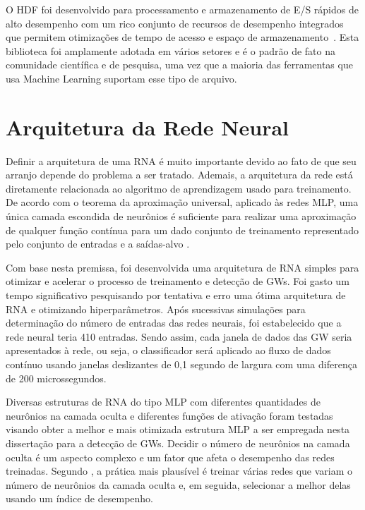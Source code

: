 O HDF foi desenvolvido para processamento e armazenamento de E/S rápidos de alto desempenho com um rico conjunto de recursos de desempenho integrados que permitem otimizações de tempo de acesso e espaço de armazenamento~\cite{hdf}. Esta biblioteca foi amplamente adotada em vários setores e é o padrão de fato na comunidade científica e de pesquisa, uma vez que a maioria das ferramentas que usa Machine Learning suportam esse tipo de arquivo.

\section{Arquitetura da Rede Neural}
\label{sec:arquitetura-rna}

Definir a arquitetura de uma RNA é muito importante devido ao fato de que seu arranjo depende do problema a ser tratado. Ademais, a arquitetura da rede está diretamente relacionada ao algoritmo de aprendizagem usado para treinamento. De acordo com o teorema da aproximação universal, aplicado às redes MLP, uma única camada escondida de neurônios é suficiente para realizar uma aproximação de qualquer função contínua para um dado conjunto de treinamento representado pelo conjunto de entradas e a saídas-alvo \cite{cybenko1989approximation, haykin2007redes}.

Com base nesta premissa, foi desenvolvida uma arquitetura de RNA simples para otimizar e acelerar o processo de treinamento e detecção de GWs. Foi gasto um tempo significativo pesquisando por tentativa e erro uma ótima arquitetura de RNA e otimizando hiperparâmetros. Após sucessivas simulações para determinação do número de entradas das redes neurais, foi estabelecido que a rede neural teria 410 entradas. Sendo assim, cada janela de dados das GW seria apresentados à rede, ou seja, o classificador será aplicado ao fluxo de dados contínuo usando janelas deslizantes de 0,1 segundo de largura com uma diferença de 200 microssegundos.

Diversas estruturas de RNA do tipo MLP com diferentes quantidades de neurônios na camada oculta e diferentes funções de ativação foram testadas visando obter a melhor e mais otimizada estrutura MLP a ser empregada nesta dissertação para a detecção de GWs. Decidir o número de neurônios na camada oculta é um aspecto complexo e um fator que afeta o desempenho das redes treinadas. Segundo \cite{OKOH201619}, a prática mais plausível é treinar várias redes que variam o número de neurônios da camada oculta e, em seguida, selecionar a melhor delas usando um índice de desempenho.

